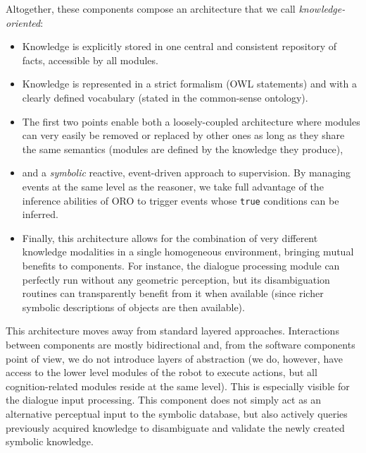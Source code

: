 \documentclass[letterpaper, 10 pt, conference]{ieeeconf}  %
\begin{document}
Altogether, these components compose an architecture that we call
\emph{knowledge-oriented}:

\begin{itemize}
    
    \item{Knowledge is explicitly stored in one central and consistent
    repository of facts, accessible by all modules.} 

    \item{Knowledge is represented in a strict formalism (OWL statements) and
    with a clearly defined vocabulary (stated in the common-sense ontology).}

    \item{The first two points enable both a loosely-coupled architecture where
    modules can very easily be removed or replaced by other ones as long as
    they share the same semantics (modules are defined by the knowledge they
    produce),} 

    \item{and a \emph{symbolic} reactive, event-driven approach to supervision.
    By managing events at the same level as the reasoner, we take full
    advantage of the inference abilities of ORO to trigger events whose
    \texttt{true} conditions can be inferred.} 

    \item{Finally, this architecture allows for the combination of very
    different knowledge modalities in a single homogeneous environment,
    bringing mutual benefits to components. For instance, the dialogue
    processing module can perfectly run without any geometric
    perception, but its disambiguation routines can transparently
    benefit from it when available (since richer symbolic descriptions of
    objects are then available).}

\end{itemize}

This architecture moves away from standard layered approaches. Interactions
between components are mostly bidirectional and, from the software components
point of view, we do not introduce layers of abstraction (we do, however, have
access to the lower level modules of the robot to execute actions, but all
cognition-related modules reside at the same level). This is especially visible
for the dialogue input processing. This component does not simply act as an
alternative perceptual input to the symbolic database, but also actively
queries previously acquired knowledge to disambiguate and validate the newly
created symbolic knowledge.
\end{document}
